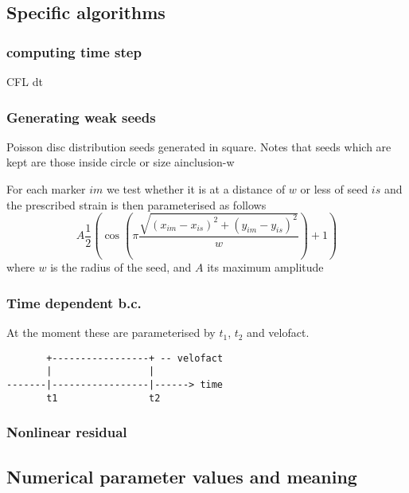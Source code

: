 \documentclass[a4paper]{article}
\begin{document}
\subsection{Specific algorithms}

\subsubsection{computing time step}

CFL dt

\subsubsection{Generating weak seeds}

Poisson disc distribution
seeds generated in square.
Notes that seeds which are kept are those inside circle or size ainclusion-w

For each marker $im$ we test whether it is at a distance of $w$ or less of 
seed $is$ and the prescribed strain is then parameterised as follows
\[
A \frac{1}{2} \left(\cos (\pi \frac{\sqrt{(x_{im}-x_{is})^2+(y_{im}-y_{is})^2}}{w}) +1 \right)
\]
where $w$ is the radius of the seed, and $A$ its maximum amplitude




\subsubsection{Time dependent b.c.}

At the moment these are parameterised by $t_1$, $t_2$ and velofact.

\begin{verbatim}
       +-----------------+ -- velofact
       |                 |
-------|-----------------|------> time
       t1                t2
\end{verbatim}



\subsubsection{Nonlinear residual}



\subsection{Numerical parameter values and meaning}
\end{document}
